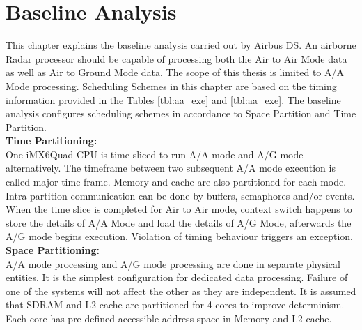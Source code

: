 \chapter{Baseline Analysis}
\label{chap:existing_analysis}
This chapter explains the baseline analysis carried out by Airbus DS\cite{fcas}. An airborne Radar processor should be capable of processing both the Air to Air Mode data as well as Air to Ground Mode data. The scope of this thesis is limited to A/A Mode processing. Scheduling Schemes in this chapter are based on the timing information provided in the Tables \ref{tbl:aa_exe} and \ref{tbl:aa_exe}. The baseline analysis configures scheduling schemes in accordance to Space Partition and Time Partition.\\ 

\noindent
\textbf{Time Partitioning:}\\
One iMX6Quad CPU is time sliced to run A/A mode and A/G mode alternatively. The timeframe between two subsequent A/A mode execution is called major time frame. Memory and cache are also partitioned for each mode. Intra-partition communication can be done by buffers, semaphores and/or events. When the time slice is completed for Air to Air mode, context switch happens to store the details of A/A Mode and load the details of A/G Mode, afterwards the A/G mode begins execution. Violation of timing behaviour triggers an exception. \\

\noindent
\textbf{Space Partitioning:} \\
A/A mode processing and A/G mode processing are done in separate physical entities. It is the simplest configuration for dedicated data processing. Failure of one of the systems will not affect the other as they are independent. It is assumed that SDRAM and L2 cache are partitioned for 4 cores to improve determinism. Each core has pre-defined accessible address space in Memory and L2 cache. 

